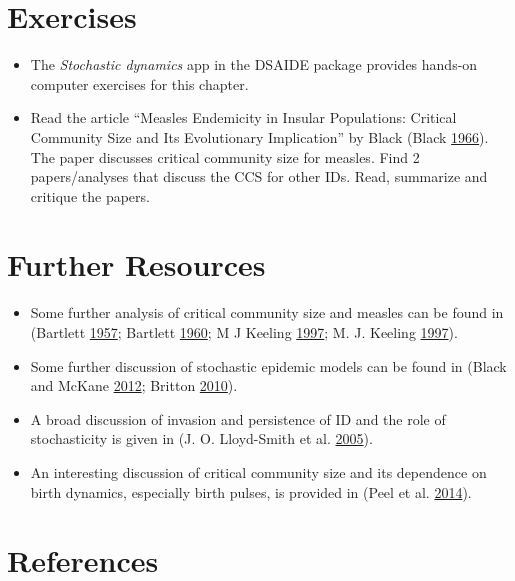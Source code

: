 \documentclass[]{book}
\providecommand{\tightlist}{%
  \setlength{\itemsep}{0pt}\setlength{\parskip}{0pt}}
\theoremstyle{definition}
\theoremstyle{definition}
\theoremstyle{definition}
\theoremstyle{remark}
\begin{document}
\section{Exercises}\label{exercises-11}

\begin{itemize}
\tightlist
\item
  The \emph{Stochastic dynamics} app in the DSAIDE package provides
  hands-on computer exercises for this chapter.
\item
  Read the article ``Measles Endemicity in Insular Populations: Critical
  Community Size and Its Evolutionary Implication'' by Black (Black
  \protect\hyperlink{ref-black66}{1966}). The paper discusses critical
  community size for measles. Find 2 papers/analyses that discuss the
  CCS for other IDs. Read, summarize and critique the papers.
\end{itemize}

\section{Further Resources}\label{further-resources-11}

\begin{itemize}
\tightlist
\item
  Some further analysis of critical community size and measles can be
  found in (Bartlett \protect\hyperlink{ref-bartlett57}{1957}; Bartlett
  \protect\hyperlink{ref-bartlett60}{1960}; M J Keeling
  \protect\hyperlink{ref-keeling97}{1997}; M. J. Keeling
  \protect\hyperlink{ref-keeling97a}{1997}).
\item
  Some further discussion of stochastic epidemic models can be found in
  (Black and McKane \protect\hyperlink{ref-black12}{2012}; Britton
  \protect\hyperlink{ref-britton10a}{2010}).
\item
  A broad discussion of invasion and persistence of ID and the role of
  stochasticity is given in (J. O. Lloyd-Smith et al.
  \protect\hyperlink{ref-lloyd-smith05b}{2005}).
\item
  An interesting discussion of critical community size and its
  dependence on birth dynamics, especially birth pulses, is provided in
  (Peel et al. \protect\hyperlink{ref-peel14}{2014}).
\end{itemize}

\section{References}\label{references-12}
\end{document}
